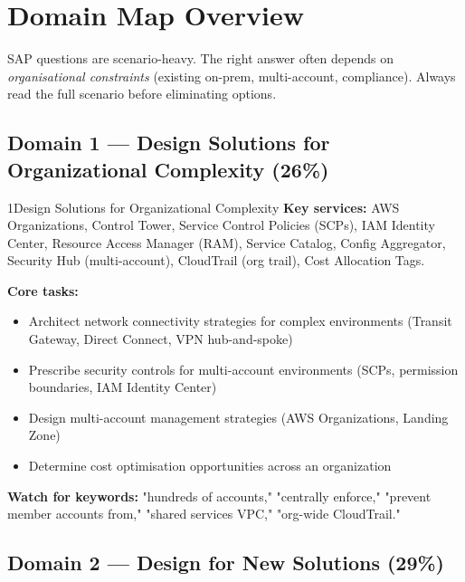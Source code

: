 
\section{Domain Map Overview}

SAP questions are scenario-heavy. The right answer often depends on
\emph{organisational constraints} (existing on-prem, multi-account, compliance).
Always read the full scenario before eliminating options.

\subsection{Domain 1 — Design Solutions for Organizational Complexity (26\%)}

\begin{domainsummary}{1}{Design Solutions for Organizational Complexity}
\textbf{Key services:} AWS Organizations, Control Tower, Service Control Policies (SCPs),
IAM Identity Center, Resource Access Manager (RAM), Service Catalog, Config Aggregator,
Security Hub (multi-account), CloudTrail (org trail), Cost Allocation Tags.

\textbf{Core tasks:}
\begin{itemize}
  \item Architect network connectivity strategies for complex environments
    (Transit Gateway, Direct Connect, VPN hub-and-spoke)
  \item Prescribe security controls for multi-account environments
    (SCPs, permission boundaries, IAM Identity Center)
  \item Design multi-account management strategies (AWS Organizations, Landing Zone)
  \item Determine cost optimisation opportunities across an organization
\end{itemize}

\textbf{Watch for keywords:} "hundreds of accounts," "centrally enforce,"
"prevent member accounts from," "shared services VPC," "org-wide CloudTrail."
\end{domainsummary}

\subsection{Domain 2 — Design for New Solutions (29\%)}

